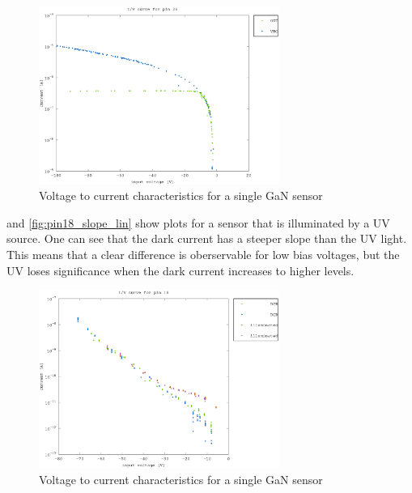 \begin{figure}[h]
	    \centering
	    \includegraphics[width=0.7\textwidth]{fig/pin26_slope.eps}
	    \caption[]%
	    {Voltage to current characteristics for a single GaN sensor}    
	    \label{fig:pin26_slope}	
\end{figure}  

 and \cref{fig:pin18_slope_lin} show plots for a sensor that is illuminated by a UV source. One can see that the dark current has a steeper slope than the UV light. This means that a clear difference is oberservable for low bias voltages, but the UV loses significance when the dark current increases to higher levels.

\begin{figure}[h]
	    \centering
        \includegraphics[width=0.7\textwidth]{fig/pin18_slope_UV.eps}
	    \caption[]%
	    {Voltage to current characteristics for a single GaN sensor}    
	    \label{fig:pin18_slope}	
\end{figure}  

